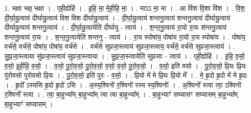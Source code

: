 \documentclass[17pt]{extarticle}
\begin{document}
1. भक्षा भक्ष॒ भक्षा । . एही॒ह्येहि॑ । . इ॒हि॒ मा॒ मे॒ही॒हि॒ मा॒ । . माऽऽ मा॒ मा । . आ वि॑श वि॒शा वि॑श । . वि॒श॒ दी॒र्घा॒यु॒त्वाय॑ दीर्घायु॒त्वाय॑ विश विश दीर्घायु॒त्वाय॑ । . दी॒र्घा॒यु॒त्वाय॑ शन्तनु॒त्वाय॑ शन्तनु॒त्वाय॑ दीर्घायु॒त्वाय॑ दीर्घायु॒त्वाय॑ शन्तनु॒त्वाय॑ । . दी॒र्घा॒यु॒त्वायेति॑ दीर्घायु - त्वाय॑ । . श॒न्त॒नु॒त्वाय॑ रा॒यो रा॒यः श॑न्तनु॒त्वाय॑ शन्तनु॒त्वाय॑ रा॒यः । . श॒न्त॒नु॒त्वायेति॑ शन्तनु - त्वाय॑ । . रा॒य स्पोषा॑य॒ पोषा॑य रा॒यो रा॒य स्पोषा॑य । . पोषा॑य॒ वर्च॑से॒ वर्च॑से॒ पोषा॑य॒ पोषा॑य॒ वर्च॑से । . वर्च॑से सुप्रजा॒स्त्वाय॑ सुप्रजा॒स्त्वाय॒ वर्च॑से॒ वर्च॑से सुप्रजा॒स्त्वाय॑ । . सु॒प्र॒जा॒स्त्वाया सु॑प्रजा॒स्त्वाय॑ सुप्रजा॒स्त्वाया । . सु॒प्र॒जा॒स्त्वायेति॑ सुप्रजाः - त्वाय॑ । . एही॒ह्येहि॑ । . इ॒हि॒ व॒सो॒ व॒सो॒ इ॒ही॒हि॒ व॒सो॒ । . व॒सो॒ पु॒रो॒व॒सो॒ पु॒रो॒व॒सो॒ व॒सो॒ व॒सो॒ पु॒रो॒व॒सो॒ । . व॒सो॒ इति॑ वसो । . पु॒रो॒व॒सो॒ प्रि॒यः प्रि॒यः पु॑रोवसो पुरोवसो प्रि॒यः । . पु॒रो॒व॒सो॒ इति॑ पुरः - व॒सो॒ । . प्रि॒यो मे॑ मे प्रि॒यः प्रि॒यो मे᳚ । . मे॒ हृ॒दो हृ॒दो मे॑ मे हृ॒दः । . हृ॒दो᳚ ऽस्यसि हृ॒दो हृ॒दो॑ ऽसि । . अ॒स्य॒श्विनो॑ र॒श्विनो॑ रस्य स्य॒श्विनोः᳚ । . अ॒श्विनो᳚ स्त्वा त्वा॒ ऽश्विनो॑ र॒श्विनो᳚ स्त्वा । . त्वा॒ बा॒हुभ्या᳚म् बा॒हुभ्या᳚म् त्वा त्वा बा॒हुभ्या᳚म् । . बा॒हुभ्याꣳ॑ सघ्यासꣳ सघ्यासम् बा॒हुभ्या᳚म् बा॒हुभ्याꣳ॑ सघ्यासम् । \newline
\end{document}
